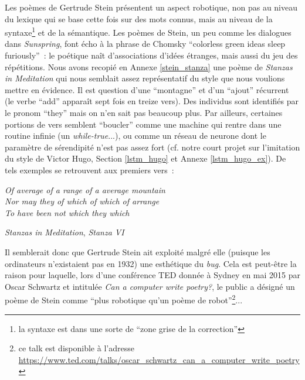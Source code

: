 \documentclass{article}
\newenvironment{citationbox}
{\begin{center}
		\begin{minipage}{.8\textwidth}
		}
		{
		\end{minipage}	
\end{center}
}
\begin{document}
				Les poèmes de Gertrude Stein présentent un aspect robotique, non pas au niveau du lexique qui se base cette fois sur des mots connus, mais au niveau de la syntaxe\footnote{la syntaxe est dans une sorte de ``zone grise de la correction''} et de la sémantique. Les poèmes de Stein, un peu comme les dialogues dans \textit{Sunspring}, font écho à la phrase de Chomsky ``colorless green ideas sleep furiously''~: le poétique naît d'associations d'idées étranges, mais aussi du jeu des répétitions. Nous avons recopié en Annexe \ref{stein_stanza} une poème de \textit{Stanzas in Meditation} qui nous semblait assez représentatif du style que nous voulions mettre en évidence. Il est question d'une ``montagne'' et d'un ``ajout'' récurrent (le verbe ``add'' apparaît sept fois en treize vers). Des individus sont identifiés par le pronom ``they'' mais on n'en sait pas beaucoup plus. Par ailleurs, certaines portions de vers semblent ``boucler'' comme une machine qui rentre dans une routine infinie (un \textit{while-true}...), ou comme un réseau de neurone dont le paramètre de sérendipité n'est pas assez fort (cf. notre court projet sur l'imitation du style de Victor Hugo, Section \ref{lstm_hugo} et Annexe \ref{lstm_hugo_ex}). De tels exemples se retrouvent aux premiers vers~: 
				\begin{citationbox}
					\textit{Of average of a range of a average mountain\\
						Nor may they of which of which of arrange\\
						To have been not which they which\\}
					\begin{flushright}
						\textit{Stanzas in Meditation}, \textit{Stanza VI} \cite{stein1932}
					\end{flushright}
				\end{citationbox}
				Il semblerait donc que Gertrude Stein ait exploité malgré elle (puisque les ordinateurs n'existaient pas en 1932) une esthétique du \textit{bug}. Cela est peut-être la raison pour laquelle, lors d'une conférence TED donnée à Sydney en mai 2015 par Oscar Schwartz et intitulée \textit{Can a computer write poetry?}, le public a désigné un poème de Stein comme ``plus robotique qu'un poème de robot''\footnote{ce talk est disponible à l'adresse \href{https://www.ted.com/talks/oscar_schwartz_can_a_computer_write_poetry}{https://www.ted.com/talks/oscar\_schwartz\_can\_a\_computer\_write\_poetry}}...\\
				
\end{document}
